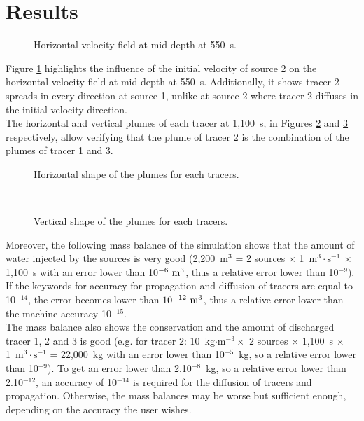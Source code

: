 \section{Results}

\begin{figure}[!htbp]
\centering
{}
 \caption{Horizontal velocity field at mid depth at 550~s.}
 \label{t3d:source:velo}
\end{figure}

\bigskip
Figure \ref{t3d:source:velo} highlights the influence of the initial velocity of
source 2 on the horizontal velocity field at mid depth at 550~s.
Additionally, it shows tracer 2 spreads in every direction
at source 1, unlike at source 2 where tracer 2 diffuses in the initial
velocity direction.\\
The horizontal and vertical plumes of each tracer at 1,100~s, in
Figures \ref{t3d:source:hor_shape} and \ref{t3d:source:ver_shape}
respectively, allow verifying that the plume of tracer 2 is the
combination of the plumes of tracer 1 and 3.

\begin{figure}[!htbp]
\centering
{}
 \caption{Horizontal shape of the plumes for each tracers.}
 \label{t3d:source:hor_shape}
\end{figure}

\begin{figure}[!htbp]
\centering
{}\\
 \caption{Vertical shape of the plumes for each tracers.}
 \label{t3d:source:ver_shape}
\end{figure}
\bigskip
Moreover, the following mass balance of the  simulation
shows that the amount of water injected by the sources is very good
(2,200~m$^3$ = 2 sources $\times$ 1~m$^3\cdot\text{s}^{-1}~\times$ 1,100~s
with an error lower than 10$^{-6}~\rm{m}^3$, thus a relative error
lower than 10$^{-9}$). If the keywords for accuracy for propagation and diffusion of tracers
are equal to 10$^{-14}$, the error becomes lower than
$10^{-12}~\rm{m}^3$, thus a relative error lower than the machine
accuracy 10$^{-15}$.\\
The mass balance also shows the conservation and the amount of
discharged tracer 1, 2 and 3 is good
(e.g. for tracer 2: 10~kg$\cdot\text{m}^{-3} \times$ 2 sources $\times$ 1,100~s
$\times$ 1~m$^3\cdot\text{s}^{-1}$ = 22,000~kg with an error lower than 10$^{-5}$~kg,
so a relative error lower than 10$^{-9}$).
To get an error lower than 2.10$^{-8}$~kg, so a relative error lower
than 2.10$^{-12}$, an accuracy of 10$^{-14}$ is required for the
diffusion of tracers and propagation.
Otherwise, the mass balances may be worse but sufficient enough,
depending on the accuracy the user wishes.

